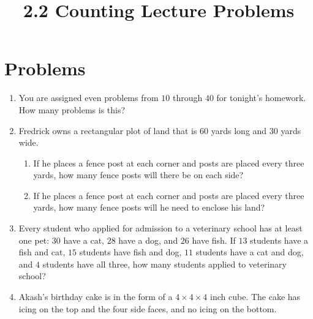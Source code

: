 \documentclass{article}
\title{2.2 Counting Lecture Problems}
\author{}
\date{}
\begin{document}
\maketitle
\section*{Problems}

\begin{enumerate}
	\item You are assigned even problems from $10$ through $40$ for tonight's homework.
        How many problems is this?
		\vspace{3cm}
    \item Fredrick owns a rectangular plot of land that is $60$ yards long and $30$ yards wide.
    \begin{enumerate}
        \item If he places a fence post at each corner and posts are placed every three yards, how many fence posts will there be on each side?
            \vspace{3cm}
        \item If he places a fence post at each corner and posts are placed every three yards, how many fence posts will he need to enclose his land?
            \vspace{3cm}
    \end{enumerate}
    \item Every student who applied for admission to a veterinary school has at least one pet: $30$ have a cat, $28$ have a dog, and $26$ have fish.
        If $13$ students have a fish and cat, $15$ students have fish and dog, $11$ students have a cat and dog, and $4$ students have all three, how many students applied to veterinary school? 
    \begin{center}
    \end{center}
    \vspace{3cm}
    \item Akash's birthday cake is in the form of a $4 \times 4 \times 4$ inch cube.
        The cake has icing on the top and the four side faces, and no icing on the bottom.

\end{enumerate}
\end{document}
